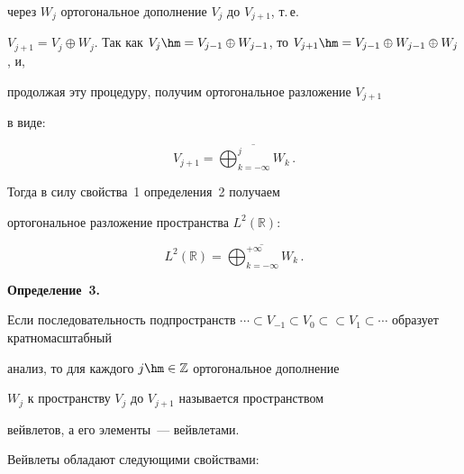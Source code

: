 через $W_{j}$ ортогональное дополнение $V_j$ до $V_{j+1}$, т.\,е.\

$V_{j+1}=V_j \oplus W_j$. Так как $V_{j}\hm=V_{j-1} \oplus

W_{j-1}$, то $V_{j+1}\hm=V_{j-1} \oplus W_{j-1} \oplus W_{j}$, и,

продолжая эту процедуру, получим ортогональное разложение $V_{j+1}$

в виде:

\begin{equation*}

        V_{j+1}=\overline{\bigoplus_{k=-\infty}^{j}{W_k}}\,.

\end{equation*}



Тогда в силу свойства~1 определения~2 получаем

ортогональное разложение пространства $L^2(\mathbb{R})$:

\begin{equation*}

    L^2(\mathbb{R})=\overline{\bigoplus_{k=-\infty}^{+\infty}{W_k}}\,.

\end{equation*}



\smallskip



\noindent

\textbf{Определение~3.}

Если последовательность подпространств $\cdots \subset V_{-1}

\subset V_0 \subset$\linebreak $\subset V_1 \subset \cdots$ образует кратномасштабный

анализ, то для каждого $j\hm \in \mathbb{Z}$ ортогональное дополнение

$W_j$ к пространству $V_j$ до $V_{j+1}$ называется пространством

вейвлетов, а его элементы~--- вейвлетами. 



\smallskip



Вейвлеты обладают следующими свойствами:

